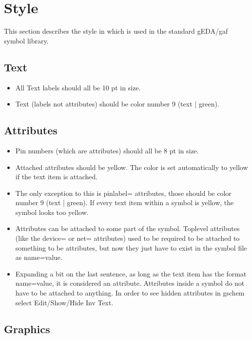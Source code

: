 \documentclass{article}
\begin{document}
\section{Style}

This section describes the style in which is used in the standard gEDA/gaf 
symbol library.

\subsection{Text}

\begin{itemize}
\item All Text labels should all be 10 pt in size.
\item Text (labels not attributes) should be color number 9 (text | green).
\end{itemize}

\subsection{Attributes}
\begin{itemize}
\item Pin numbers (which are attributes) should all be 8 pt in size.
\item Attached attributes should be yellow.  The color is set
      automatically to yellow if the text item is attached.
\item The only exception to this is pinlabel= attributes, those should be
      color number 9 (text | green).  If every text item within a symbol is
      yellow, the symbol looks too yellow.
\item Attributes can be attached to some part of the symbol.
      Toplevel attributes (like the device= or net= attributes) used to
      be required to be attached to something to be attributes, but now
      they just have to exist in the symbol file as name=value.
\item Expanding a bit on the last sentence, as long as the text item
      has the format name=value, it is considered an attribute.
      Attributes inside a symbol do not have to be attached to anything.
      In order to see hidden attributes in gschem select Edit/Show/Hide Inv
      Text.


\end{itemize}

\subsection{Graphics}
\end{document}
